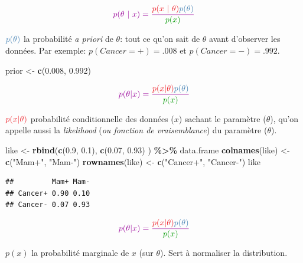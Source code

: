 \documentclass[
  a4paper,11pt,twoside,onecolumn,openright,final,oldfontcommands]{memoir}
\newenvironment{Shaded}{\begin{snugshade}}{\end{snugshade}}
\newcommand{\FloatTok}[1]{\textcolor[rgb]{0.00,0.00,0.81}{#1}}
\newcommand{\KeywordTok}[1]{\textcolor[rgb]{0.13,0.29,0.53}{\textbf{#1}}}
\newcommand{\NormalTok}[1]{#1}
\newcommand{\OperatorTok}[1]{\textcolor[rgb]{0.81,0.36,0.00}{\textbf{#1}}}
\newcommand{\StringTok}[1]{\textcolor[rgb]{0.31,0.60,0.02}{#1}}
\theoremstyle{definition}
\theoremstyle{definition}
\theoremstyle{definition}
\theoremstyle{remark}
\begin{document}
\[
\color{purple}{p(\theta \ | \ x)} = \dfrac{\color{orangered}{p(x \ | \ \theta)} \color{steelblue}{p(\theta)}}{\color{green}{p(x)}}
\]

\(\color{steelblue}{p(\theta)}\) { la probabilité \emph{a priori} de \(\theta\): tout ce qu'on sait de \(\theta\) avant d'observer les données. Par exemple: \(p(Cancer=+)=.008\) et \(p(Cancer=-)=.992\).}

\begin{Shaded}
\begin{Highlighting}[]
\NormalTok{prior \textless{}{-}}\StringTok{ }\KeywordTok{c}\NormalTok{(}\FloatTok{0.008}\NormalTok{, }\FloatTok{0.992}\NormalTok{)}
\end{Highlighting}
\end{Shaded}

\[
\color{purple}{p(\theta \vert x)} = \dfrac{\color{orangered}{p(x\vert \theta)} \color{steelblue}{p(\theta)}}{\color{green}{p(x)}}
\]

\(\color{orangered}{p(x\vert \theta)}\) { probabilité conditionnelle des données (\(x\)) sachant le paramètre (\(\theta\)), qu'on appelle aussi la \emph{likelihood} (\emph{ou fonction de vraisemblance}) du paramètre (\(\theta\)).}

\begin{Shaded}
\begin{Highlighting}[]
\NormalTok{like \textless{}{-}}\StringTok{ }\KeywordTok{rbind}\NormalTok{(}\KeywordTok{c}\NormalTok{(}\FloatTok{0.9}\NormalTok{, }\FloatTok{0.1}\NormalTok{), }\KeywordTok{c}\NormalTok{(}\FloatTok{0.07}\NormalTok{, }\FloatTok{0.93}\NormalTok{) ) }\OperatorTok{\%\textgreater{}\%}\StringTok{ }\NormalTok{data.frame}
\KeywordTok{colnames}\NormalTok{(like) \textless{}{-}}\StringTok{ }\KeywordTok{c}\NormalTok{(}\StringTok{"Mam+"}\NormalTok{, }\StringTok{"Mam{-}"}\NormalTok{)}
\KeywordTok{rownames}\NormalTok{(like) \textless{}{-}}\StringTok{ }\KeywordTok{c}\NormalTok{(}\StringTok{"Cancer+"}\NormalTok{, }\StringTok{"Cancer{-}"}\NormalTok{)}
\NormalTok{like}
\end{Highlighting}
\end{Shaded}

\begin{verbatim}
##         Mam+ Mam-
## Cancer+ 0.90 0.10
## Cancer- 0.07 0.93
\end{verbatim}

\[
\color{purple}{p(\theta \vert x)} = \dfrac{\color{orangered}{p(x\vert \theta)} \color{steelblue}{p(\theta)}}{\color{green}{p(x)}}
\]

{ \(p(x)\) la probabilité marginale de \(x\) (sur \(\theta\)). Sert à normaliser la distribution.}
\end{document}
